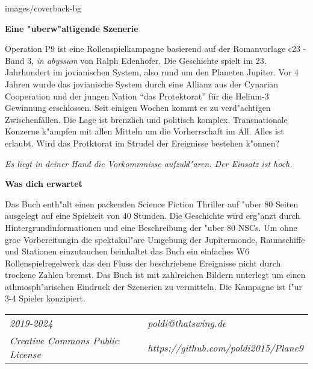 \begin{backcover}{images/coverback-bg}
    
    \vspace{5mm}
    \textbf{Eine "uberw"altigende Szenerie}

    Operation P9 ist eine Rollenspielkampagne basierend auf der Romanvorlage c23 - Band 3, \textit{in abyssum} von Ralph Edenhofer. Die Geschichte spielt im 23. Jahrhundert im jovianischen System, also rund um den Planeten Jupiter. Vor 4 Jahren wurde das jovianische System durch eine Allianz aus der Cynarian Cooperation und der jungen Nation "`das Protektorat"' für die Helium-3 Gewinnung erschlossen. Seit einigen Wochen kommt es zu verd"achtigen Zwischenfällen. Die Lage ist brenzlich und politisch komplex. Transnationale Konzerne k"ampfen mit allen Mitteln um die Vorherrschaft im All. Alles ist erlaubt. Wird das Protktorat im Strudel der Ereignisse bestehen k"onnen?
    
    \medskip
    \emph{Es liegt in deiner Hand die Vorkommnisse aufzukl"aren. Der Einsatz ist hoch.}

    \vspace{5mm}
    \textbf{Was dich erwartet}

    Das Buch enth"alt einen packenden Science Fiction Thriller auf "uber 80 Seiten ausgelegt auf eine Spielzeit von 40 Stunden. Die Geschichte wird erg"anzt durch Hintergrundinformationen und eine Beschreibung der "uber 80 NSCs. Um ohne gro\3e Vorbereitungin die spektakul"are Umgebung der Jupitermonde, Raumschiffe und Stationen einzutauchen beinhaltet das Buch ein einfaches W6 Rollenspielregelwerk das den Fluss der beschriebene Ereignisse nicht durch trockene Zahlen bremst. Das Buch ist mit zahlreichen Bildern unterlegt um einen athmosph"arischen Eindruck der Szenerien zu vermitteln. Die Kampagne ist f"ur 3-4 Spieler konzipiert.

    \vspace{15mm}
    \newcommand{\footerentry}[1]{\textit{\normalsize{}{#1}}}
    \begin{tabularx}{\textwidth} {
        >{\raggedright\arraybackslash}X
        >{\raggedleft\arraybackslash}X
    }
        \footerentry{2019-2024} & \footerentry{poldi@thatswing.de}\\
        \footerentry{Creative Commons Public License} & \footerentry{https://github.com/poldi2015/Plane9}
    \end{tabularx}
    
\end{backcover}
